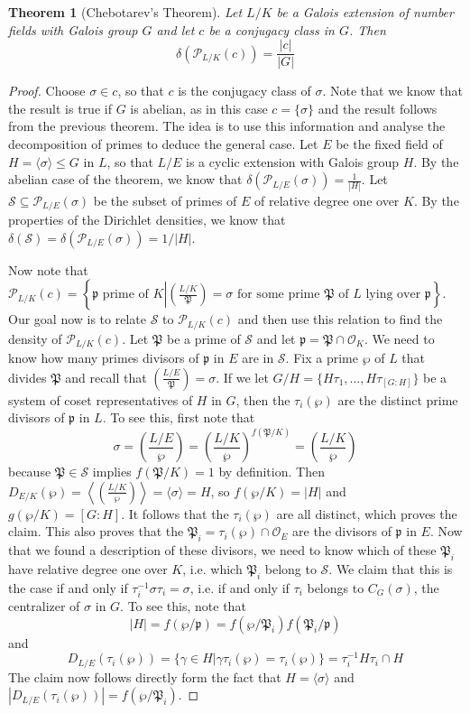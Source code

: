 \documentclass[]{amsart}
\newtheorem{theorem}{Theorem}
\renewcommand{\S}{\mathcal{S}}
\newcommand{\OK}{\mathcal{O}_K}
\newcommand{\p}{\mathfrak{p}}
\renewcommand{\P}{\mathfrak{P}}
\newcommand{\PP}{\mathcal{P}}
\newcommand{\Frob}[2]{\left(\frac{#1}{#2}\right )}
\begin{document}
		\begin{theorem}[Chebotarev's Theorem]
			Let $L/K$ be a Galois extension of number fields with Galois group $G$ and let $c$ be a conjugacy class in $G$. Then
			\[\delta(\PP_{L/K}(c))=\frac{|c|}{|G|}\]
		\end{theorem}
		\begin{proof}
			Choose $\sigma\in c$, so that $c$ is the conjugacy class of $\sigma$.
			Note that we know that the result is true if $G$ is abelian, as in this case $c=\{\sigma\}$ and the result follows from the previous theorem. The idea is to use this information and analyse the decomposition of primes to deduce the general case. Let $E$ be the fixed field of $H=\langle\sigma\rangle\leq G$ in $L$, so that $L/E$ is a cyclic extension with Galois group $H$. By the abelian case of the theorem, we know that $\delta(\PP_{L/E}(\sigma))=\frac{1}{|H|}$. Let $\S\subseteq\PP_{L/E}(\sigma)$ be the subset of primes of $E$ of relative degree one over $K$. By the properties of the Dirichlet densities, we know that $\delta(\S)=\delta(\PP_{L/E}(\sigma))=1/|H|$.
			
			Now note that $\PP_{L/K}(c)=\left \{\p\text{ prime of }K\left |\Frob{L/K}{\P}=\sigma\text{ for some prime }\P\text{ of }L\text{ lying over }\p\right .\right \}$. Our goal now is to relate $\S$ to $\PP_{L/K}(c)$ and then use this relation to find the density of $\PP_{L/K}(c)$. Let $\P$ be a prime of $\S$ and let $\p=\P\cap\OK$. We need to know how many primes divisors of $\p$ in $E$ are in $\S$. Fix a prime $\wp$ of $L$ that divides $\P$ and recall that $\Frob{L/E}{\P}=\sigma$. If we let $G/H=\{H\tau_1,\dots,H\tau_{[G:H]}\}$ be a system of coset representatives of $H$ in $G$, then the $\tau_i(\wp)$ are the distinct prime divisors of $\p$ in $L$. To see this, first note that
			\[\sigma=\Frob{L/E}{\wp}=\Frob{L/K}{\wp}^{f(\P/K)}=\Frob{L/K}{\wp}\]
			because $\P\in\S$ implies $f(\P/K)=1$ by definition. Then $D_{E/K}(\wp)=\left \langle\Frob{L/K}{\wp}\right \rangle=\langle\sigma\rangle=H$, so $f(\wp/K)=|H|$ and $g(\wp/K)=[G:H]$. It follows that the $\tau_i(\wp)$ are all distinct, which proves the claim. This also proves that the $\P_i=\tau_i(\wp)\cap\mathcal{O}_E$ are the divisors of $\p$ in $E$. Now that we found a description of these divisors, we need to know which of these $\P_i$ have relative degree one over $K$, i.e. which $\P_i$ belong to $\S$. We claim that this is the case if and only if $\tau_i^{-1}\sigma\tau_i=\sigma$, i.e. if and only if $\tau_i$ belongs to $C_G(\sigma)$, the centralizer of $\sigma$ in $G$. To see this, note that
			\[|H|=f(\wp/\p)=f(\wp/\P_i)f(\P_i/\p)\]
			and 
			\[D_{L/E}(\tau_i(\wp))=\{\gamma\in H|\gamma\tau_i(\wp)=\tau_i(\wp)\}=\tau_i^{-1}H\tau_i\cap H\]
			The claim now follows directly form the fact that $H=\langle\sigma\rangle$ and $|D_{L/E}(\tau_i(\wp))|=f(\wp/\P_i)$. 
			

\end{proof}
\end{document}
